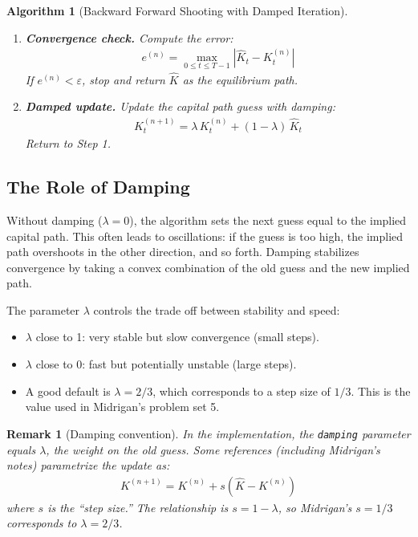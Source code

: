 \documentclass[12pt]{article}
\newtheorem{algorithm_env}{Algorithm}
\newtheorem{remark}{Remark}
\begin{document}
\begin{algorithm_env}[Backward Forward Shooting with Damped Iteration]
\begin{enumerate}[label=\textbf{Step \arabic*.}, leftmargin=2.5cm]
    \item \textbf{Convergence check.} Compute the error:
    \begin{align*}
        e^{(n)} = \max_{0 \leq t \leq T-1} \left| \hat{K}_t - K^{(n)}_t \right|
    \end{align*}
    If $e^{(n)} < \varepsilon$, stop and return $\hat{K}$ as the equilibrium path.

    \item \textbf{Damped update.} Update the capital path guess with damping:
    \begin{align}
        K^{(n+1)}_t = \lambda \, K^{(n)}_t + (1 - \lambda) \, \hat{K}_t \label{eq:damping}
    \end{align}
    Return to Step 1.
\end{enumerate}
\end{algorithm_env}

\subsection{The Role of Damping}

Without damping ($\lambda = 0$), the algorithm sets the next guess equal to the implied capital path. This often leads to oscillations: if the guess is too high, the implied path overshoots in the other direction, and so forth. Damping stabilizes convergence by taking a convex combination of the old guess and the new implied path.

The parameter $\lambda$ controls the trade off between stability and speed:
\begin{itemize}[nosep]
    \item $\lambda$ close to 1: very stable but slow convergence (small steps).
    \item $\lambda$ close to 0: fast but potentially unstable (large steps).
    \item A good default is $\lambda = 2/3$, which corresponds to a step size of $1/3$. This is the value used in Midrigan's problem set 5.
\end{itemize}

\begin{remark}[Damping convention]
In the implementation, the \texttt{damping} parameter equals $\lambda$, the weight on the \emph{old} guess. Some references (including Midrigan's notes) parametrize the update as:
\begin{align*}
    K^{(n+1)} = K^{(n)} + s \left(\hat{K} - K^{(n)}\right)
\end{align*}
where $s$ is the ``step size.'' The relationship is $s = 1 - \lambda$, so Midrigan's $s = 1/3$ corresponds to $\lambda = 2/3$.
\end{remark}
\end{document}
